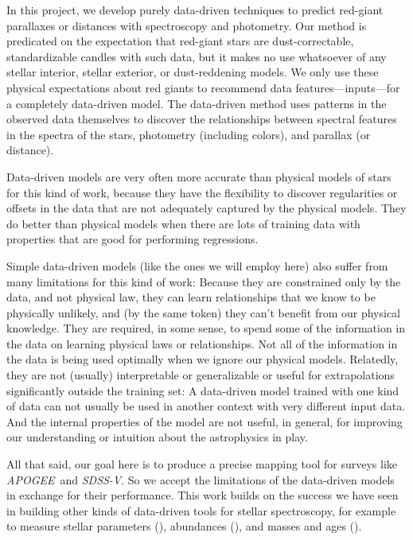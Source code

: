 \documentclass[modern]{aastex62}
\newcommand{\acronym}[1]{{\small{#1}}}
\newcommand{\project}[1]{\textsl{#1}}
\newcommand{\apogee}{\project{\acronym{APOGEE}}}
\newcommand{\sdssv}{\project{\acronym{SDSS-V}}}
\begin{document}
In this project, we develop purely data-driven techniques to predict
red-giant parallaxes or distances with spectroscopy and photometry.
Our method is predicated on the expectation that red-giant stars are dust-correctable,
standardizable candles with such data,
but it makes no use whatsoever of any stellar interior,
stellar exterior, or dust-reddening models.
We only use these physical expectations about red giants to recommend
data features---inputs---for a completely data-driven model.
The data-driven method uses patterns in the observed data themselves
to discover the relationships between spectral features in the spectra of the stars,
photometry (including colors), and parallax (or distance).

Data-driven models are very often more accurate than physical models of stars
for this kind of work, because they have the flexibility to discover
regularities or offsets in the data that are not adequately captured by the physical
models.
They do better than physical models when there are lots of training data
with properties that are good for performing regressions.

Simple data-driven models (like the ones we will employ here)
also suffer from many limitations for this kind of work:
Because they are constrained only by the data, and not physical law,
they can learn relationships that we know
to be physically unlikely, and (by the same token) they can't benefit from our
physical knowledge.
They are required, in some sense, to spend some of the information in the data on
learning physical laws or relationships.
Not all of the information in the data is being used
optimally when we ignore our physical models.
Relatedly, they are not (usually) interpretable or generalizable or useful for
extrapolations significantly outside the training set:
A data-driven model trained with one kind of data can not usually be used in another
context with very different input data.
And the internal properties of the model are not useful, in general, for improving
our understanding or intuition about the astrophysics in play.

All that said, our goal here is to produce a precise mapping tool for surveys
like \apogee\ and \sdssv.
So we accept the limitations of the data-driven models in exchange for their
performance.
This work builds on the success we have seen in building other kinds of
data-driven tools for  stellar spectroscopy, for example to measure stellar
parameters (\citealt{cannon}), abundances (\citealt{ho, casey, nessdopp}),
and masses and ages (\citealt{nessage}).
\end{document}
